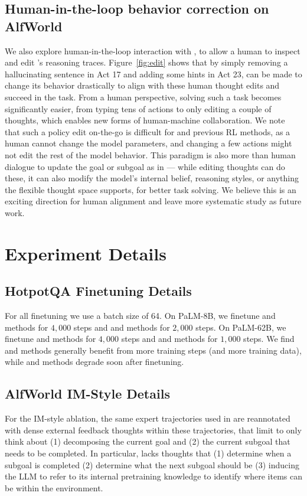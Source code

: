 \subsection{Human-in-the-loop behavior correction on AlfWorld} 

We also explore human-in-the-loop interaction with \model{}, to allow a human to inspect and edit \model's reasoning traces. Figure~\ref{fig:edit} shows that
by simply removing a hallucinating sentence in Act 17 and adding some hints in Act 23, \model{} can be made to change its behavior drastically to align with these human thought edits and succeed in the task. 
From a human perspective, solving such a task becomes significantly easier, from typing tens of actions to only editing a couple of thoughts, which enables new forms of human-machine collaboration.
We note that such a policy edit on-the-go is difficult for \act{} and previous RL methods, as a human cannot change the model parameters, and changing a few actions might not edit the rest of the model behavior. 
This paradigm is also more than human dialogue to update the goal or subgoal as in \citet{huang2022inner} --- while editing \model{} thoughts can do these, it can also modify the model's internal belief, reasoning styles, or anything the flexible thought space supports, for better task solving. 
We believe this is an exciting direction for human alignment and leave more systematic study as future work.

\section{Experiment Details}
\subsection{HotpotQA Finetuning Details}
\label{sec:hotpot_finetune}
For all finetuning we use a batch size of 64.
On PaLM-8B, we finetune \model{} and \act{} methods for $4,000$ steps and \palm{} and \reason{} methods for $2,000$ steps. 
On PaLM-62B, we finetune \model{} and \act{} methods for $4,000$ steps and \palm{} and \reason{} methods for $1,000$ steps. 
We find \model{} and \act{} methods generally benefit from more training steps (and more training data), while  \palm{} and \reason{} methods degrade soon after finetuning.

\subsection{AlfWorld IM-Style Details}
\label{sec:alfworld_im}
For the IM-style ablation, the same expert trajectories used in \model{} are reannotated with dense external feedback thoughts within these trajectories, that limit \modelim{} to only think about (1) decomposing the current goal and (2) the current subgoal that needs to be completed. In particular, \modelim{} lacks thoughts that (1) determine when a subgoal is completed (2) determine what the next subgoal should be (3) inducing the LLM to refer to its internal pretraining knowledge to identify where items can be within the environment. 


